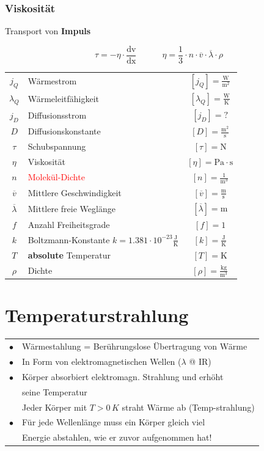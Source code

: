 \subsubsection{Viskosität}
Transport von \textbf{Impuls} 


$$ \boxed{ \tau = - \eta \cdot \frac{\mathrm{dv}}{\mathrm{dx}} \qquad \quad  \eta = \frac{1}{3} \cdot n \cdot \overline{v} \cdot \overline{\lambda} \cdot \rho }  $$


\begin{tabular}{c l c}
	\rule{0pt}{10pt}$j_Q$ & Wärmestrom & $[j_Q] = \mathrm{\frac{W}{m^2}}$ \\
	\rule{0pt}{10pt}$\lambda_Q$ & Wärmeleitfähigkeit & $[\lambda_Q] = \mathrm{\frac{W}{K}}$ \\
	$j_D$ & Diffusionsstrom & $[j_D] = ?$ \\
	\rule{0pt}{10pt}$D$ & Diffusionskonstante & $[D] = \mathrm{\frac{m^2}{s}}$ \\
	$\tau$ & Schubspannung & $[\tau] = \mathrm{N}$ \\
	$\eta$ & Viskosität & $[\eta] = \mathrm{Pa \cdot s}$ \\
	\rule{0pt}{10pt}$n$ & \textcolor{red}{Molekül-Dichte} & $[n] = \mathrm{\frac{1}{m^3}}$\\	
	\rule{0pt}{10pt}$\overline{v}$ & Mittlere Geschwindigkeit & $[\overline{v}] = \mathrm{\frac{m}{s}}$ \\
	\rule{0pt}{10pt}$\overline{\lambda}$ & Mittlere freie Weglänge & $[\overline{\lambda}] = \mathrm{m}$ \\
	$f$ & Anzahl Freiheitsgrade & $[f] = \mathrm{1}$ \\
	\rule{0pt}{10pt}$k$ & Boltzmann-Konstante $k = 1.381 \cdot 10^{-23} \mathrm{\frac{J}{K}}$ & $[k] = \mathrm{\frac{J}{K}}$ \\
	$T$ & \textbf{absolute} Temperatur & $[T] = \mathrm{K}$ \\
	\rule{0pt}{10pt}$\rho$ & Dichte & $[\rho] = \mathrm{\frac{kg}{m^3}}$ \\
\end{tabular}


\section{Temperaturstrahlung}

\begin{tabular}{ll}
$\bullet$ & Wärmestahlung = Berührungslose Übertragung von Wärme \\
$\bullet$ & In Form von elektromagnetischen Wellen ($\lambda$ @ IR) \\
$\bullet$ & Körper absorbiert elektromagn. Strahlung und erhöht \\
		  & seine Temperatur \\ 
          & Jeder Körper mit $T > 0 \, K$ straht Wärme ab (Temp-strahlung) \\
$\bullet$ & Für jede Wellenlänge muss ein Körper gleich viel  \\
		  & Energie abstahlen, wie er zuvor aufgenommen hat!\\
\end{tabular}




